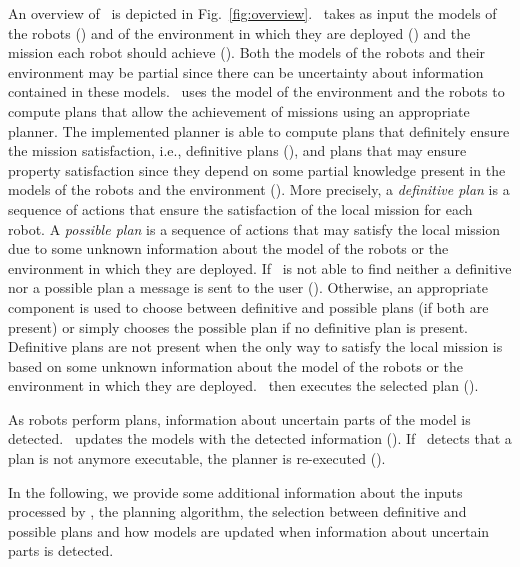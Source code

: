 
An overview of \toolName\ is depicted in Fig.~\ref{fig:overview}.
\toolName\ takes as input the models of the robots () and of the environment in which they are deployed () and the mission each robot should achieve ().
Both the models of the robots and their environment may be partial since there can be uncertainty about information contained in these models.
\toolName\ uses the model of the environment and the robots to compute plans that allow the achievement of missions using an appropriate planner.
The implemented planner is able to compute plans that definitely ensure the mission satisfaction, i.e., definitive plans  (), and plans that may ensure property satisfaction since they depend on some partial knowledge present in the models of the robots and the environment  ().
More precisely, a \emph{definitive plan} is a sequence of actions that ensure the satisfaction of the local mission for each robot. 
A \emph{possible plan} is a sequence of actions that may satisfy the local mission due to some unknown information about the model of the robots or the environment in which they are deployed. 
If \toolName\ is not able to find neither a definitive nor a possible plan a message is sent to the user ().
Otherwise, an appropriate component is used to choose between definitive and possible plans (if both are present) or simply chooses the possible plan if no definitive plan is present.
Definitive plans are not present when the only way to satisfy the local mission is based on some unknown information about the model of the robots or the environment in which they are deployed. 
\toolName\ then executes the selected plan ().

As robots perform plans, information about uncertain parts of the model is detected.
\toolName\ updates the  models with the detected information ().
If \toolName\  detects that a plan is not anymore executable, the planner is re-executed ().


In the following, we provide some additional information about the inputs processed  by \toolName, the planning algorithm, the selection between definitive and possible plans and how models are updated when information about uncertain parts is detected.



